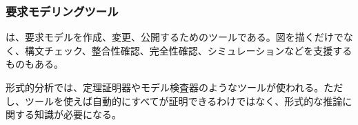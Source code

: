 \subsubsection{要求モデリングツール}

は、要求モデルを作成、変更、公開するためのツールである。図を描くだけでなく、構文チェック、整合性確認、完全性確認、シミュレーションなどを支援するものもある。

形式的分析では、定理証明器やモデル検査器のようなツールが使われる。ただし、ツールを使えば自動的にすべてが証明できるわけではなく、形式的な推論に関する知識が必要になる。
